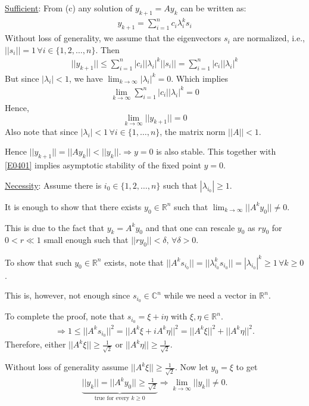 \begin{solution}[3.1]
\begin{enumerate}
\underline{Sufficient}: From (c) any solution of $y_{k+1} = Ay_k$ can be written as:
\begin{align}
	y_{k+1} = \sum_{i=1}^n c_i \lambda_i^k s_i
\end{align}
Without loss of generality, we assume that the eigenvectors $s_i$ are normalized, i.e., $||s_i|| = 1 \,\forall i\in\{1,2,\ldots,n\}$. Then
\begin{align}
	||y_{k+1}|| \leq \sum_{i=1}^n |c_i||\lambda_i|^k ||s_i|| = \sum_{i=1}^n |c_i||\lambda_i|^k
\end{align}
But since $|\lambda_i|<1$, we have $\displaystyle \lim_{k \rightarrow \infty} |\lambda_i|^k = 0$. Which implies
\begin{align}
	\lim_{k \rightarrow \infty} \sum_{i=1}^n |c_i||\lambda_i|^k = 0
\end{align}
Hence, 
\begin{equation}\label{E0401}
	\lim_{k \rightarrow \infty} ||y_{k+1}||=0
\end{equation}
Also note that since $|\lambda_i|<1 \,\forall i\in \{1,\ldots,n\}$, the matrix norm $||A||<1$.

Hence $||y_{k+1}|| = ||Ay_k|| < ||y_k||. \Longrightarrow y=0$ is also stable. This together with \eqref{E0401} implies asymptotic stability of the fixed point $y=0$.

\underline{Necessity}: Assume there is $i_0\in\{1,2,\ldots, n\}$ such that $|\lambda_{i_0}| \geq 1$.

It is enough to show that there exists $y_0 {\in\mathbb{R}^n}$ such that $\lim_{k \rightarrow \infty} ||A^ky_0|| \neq 0$.

This is due to the fact that $y_k = A^ky_0$ and that one can rescale $y_0$ as $ry_0$ for $0<r \ll 1$ small enough such that $||ry_0||<\delta, \,\forall \delta > 0$.

To show that such $y_0 \in \mathbb{R}^n$ exists, note that $||A^ks_{i_0}|| = ||\lambda_{i_0}^ks_{i_0}|| = |\lambda_{i_0}|^k \geq 1 \,\forall k \geq 0$.
\begin{remark}[]
	This is, however, not enough since $s_{i_0}\in\mathbb{C}^n$ while we need a vector in $\mathbb{R}^n$.
\end{remark}

To complete the proof, note that $s_{i_0}=\xi + i\eta$ with $\xi, \eta \in \mathbb{R}^n$.
\begin{align}
	\Longrightarrow 1 \leq ||A^ks_{i_0}||^2 = ||A^k\xi + i A^k\eta ||^2 = ||A^k\xi||^2 + ||A^k\eta||^2.
\end{align}
Therefore, either $||A^k\xi|| \geq \frac{1}{\sqrt{2}}$ or $||A^k\eta|| \geq \frac{1}{\sqrt{2}}$.

Without loss of generality assume $||A^k\xi|| \geq \frac{1}{\sqrt{2}}$. Now let $y_0 = \xi$ to get
\begin{align}
	\underbrace{||y_k|| = ||A^ky_0|| \geq \frac{1}{\sqrt{2}}}_{\text{true for every }k\geq 0} \Longrightarrow \lim_{k \rightarrow \infty} ||y_k|| \neq 0.
\end{align}
\end{enumerate}
\end{solution}

